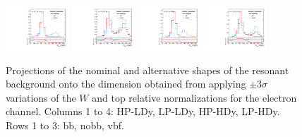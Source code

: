 \begin{figure}[htbp]
  \includegraphics[width=0.21\textwidth]{fig/uncertainties/systs_res_e_HP_vbf_LDy_fractionY_ProjY.pdf}
  \includegraphics[width=0.21\textwidth]{fig/uncertainties/systs_res_e_LP_vbf_LDy_fractionY_ProjY.pdf}
  \includegraphics[width=0.21\textwidth]{fig/uncertainties/systs_res_e_HP_vbf_HDy_fractionY_ProjY.pdf}
  \includegraphics[width=0.21\textwidth]{fig/uncertainties/systs_res_e_LP_vbf_HDy_fractionY_ProjY.pdf}\\
  \caption{
    Projections of the nominal and alternative shapes of the resonant background onto the \MJ dimension obtained from applying $\pm3\sigma$ variations of the $W$ and top relative normalizations for the electron channel.
    Columns 1 to 4: HP-LDy, LP-LDy, HP-HDy, LP-HDy.
    Rows 1 to 3: bb, nobb, vbf.
  }
  \label{fig:systResMJ_fractionY}
\end{figure}
